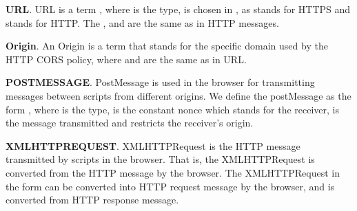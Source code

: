 \vspace{1mm}\noindent\textbf{URL}.
URL is a term , where  is the type,  is chosen in ,  as  stands for HTTPS and  stands for HTTP. The , and  are the same as in HTTP messages.

\vspace{1mm}\noindent\textbf{Origin}.
An Origin is a term  that stands for the specific domain used by the HTTP CORS policy, where  and  are the same as in URL.

\vspace{1mm}\noindent\textbf{POSTMESSAGE}.
PostMessage is used in the browser for transmitting messages between scripts from different origins. We define the postMessage as the form , where  is the type,  is the constant nonce which stands for the receiver,  is the message transmitted and  restricts the receiver's origin.

\vspace{1mm}\noindent\textbf{XMLHTTPREQUEST}.
XMLHTTPRequest is the HTTP message transmitted  by scripts in the browser. That is, the XMLHTTPRequest is converted from the HTTP message by the browser. The XMLHTTPRequest in the form  can be converted into HTTP request message by the browser, and   is converted from HTTP response message.

